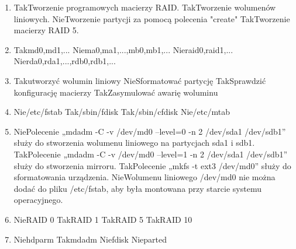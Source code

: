 \begin{enumerate}
		\newpage
		\item {}%
		{Tak}{Tworzenie programowych macierzy RAID.}%
		{Tak}{Tworzenie wolumenów liniowych.}%
		{Nie}{Tworzenie partycji za pomocą polecenia "create"}%
		{Tak}{Tworzenie macierzy RAID 5.}
		\item {}%
		{Tak}{md0,md1,...}%
		{Nie}{ma0,ma1,...,mb0,mb1,...}%
		{Nie}{raid0,raid1,...}%
		{Nie}{rda0,rda1,...,rdb0,rdb1,...}
		\item {}%
		{Tak}{utworzyć wolumin liniowy}%
		{Nie}{Sformatować partycję}%
		{Tak}{Sprawdzić konfigurację macierzy}%
		{Tak}{Zasymulować awarię woluminu}
		\item {}%
		{Nie}{/etc/fstab}%
		{Tak}{/sbin/fdisk}%
		{Tak}{/sbin/cfdisk}%
		{Nie}{/etc/mtab}
		\item {}%
		{Nie}{Polecenie „mdadm -C -v /dev/md0 --level=0 -n 2 /dev/sda1 /dev/sdb1” służy do stworzenia wolumenu liniowego na partycjach sda1 i sdb1.}%
		{Tak}{Polecenie „mdadm -C -v /dev/md0 –level=1 -n 2 /dev/sda1 /dev/sdb1” służy do stworzenia mirroru.}%
		{Tak}{Polecenie „mkfs -t ext3 /dev/md0” służy do sformatowania urządzenia.}%
		{Nie}{Wolumenu liniowego /dev/md0 nie można dodać do pliku /etc/fstab, aby była montowana przy starcie systemu operacyjnego.}
		\item {}%
		{Nie}{RAID 0}%
		{Tak}{RAID 1}%
		{Tak}{RAID 5}%
		{Tak}{RAID 10}
		\item {}%
		{Nie}{hdparm}%
		{Tak}{mdadm}%
		{Nie}{fdisk}%
		{Nie}{parted}
		

\end{enumerate}
